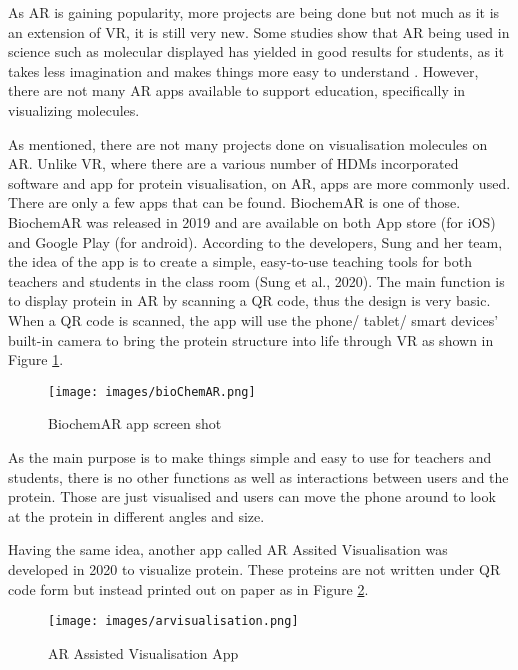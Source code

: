 As AR is gaining popularity, more projects are being done but not much as it is an extension of VR, it is still very new. Some studies show that AR being used in science such as molecular displayed has yielded in good results for students, as it takes less imagination and makes things more easy to understand \parencite{cai_case_2014}. However, there are not many AR apps available to support education, specifically in visualizing molecules. 

As mentioned, there are not many projects done on visualisation molecules on AR. Unlike VR, where there are a various number of HDMs incorporated software and app for protein visualisation, on AR, apps are more commonly used. There are only a few apps that can be found. BiochemAR is one of those. BiochemAR was released in 2019 and are available on both App store (for iOS) and Google Play (for android). According to the developers, Sung and her team, the idea of the app is to create a simple, easy-to-use teaching tools for both teachers and students in the class room (Sung et al., 2020). The main function is to display protein in AR by scanning a QR code, thus the design is very basic. When a QR code is scanned, the app will use the phone/ tablet/ smart devices’ built-in camera to bring the protein structure into life through VR as shown in Figure \ref{fig:bioChemAR}.
\begin{figure}[!htbp]
	\centering
	\texttt{[image: images/bioChemAR.png]}
	\caption{BiochemAR app screen shot}
	\label{fig:bioChemAR}
\end{figure}





As the main purpose is to make things simple and easy to use for teachers and students, there is no other functions as well as interactions between users and the protein. Those are just visualised and users can move the phone around to look at the protein in different angles and size. 

Having the same idea, another app called  AR Assited Visualisation
was developed in 2020 to visualize protein. These proteins are not written under QR code form but instead printed out on paper as in Figure \ref{fig:arvisualisation}. 

\begin{figure}[!htbp]
	\centering
	\texttt{[image: images/arvisualisation.png]}
	\caption{AR Assisted Visualisation App \parencite{eriksen_visualizing_2020}}
	\label{fig:arvisualisation}
\end{figure}

